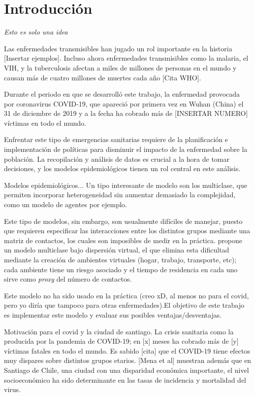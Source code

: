 \chapter{Introducción}

\textit{Esto es solo una idea}

Las enfermedades transmisibles han jugado un rol importante en la historia [Insertar ejemplos]. Incluso ahora enfermedades transmisibles como la malaria, el VIH, y la tuberculosis afectan a miles de millones de personas en el mundo y causan más de cuatro millones de muertes cada año [Cita WHO].

Durante el periodo en que se desarrolló este trabajo, la enfermedad provocada por coronavirus COVID-19, que apareció por primera vez en Wuhan (China) el 31 de diciembre de 2019 y a la fecha ha cobrado más de [INSERTAR NUMERO] víctimas en todo el mundo. 

Enfrentar este tipo de emergencias sanitarias requiere de la planificación e implementación de políticas para disminuir el impacto de la enfermedad sobre la población. La recopilación y análisis de datos es crucial a la hora de tomar decisiones, y los modelos epidemiológicos tienen un rol central en este análisis.

Modelos epidemiológicos... Un tipo interesante de modelo son los multiclase, que permiten incorporar heterogeneidad sin aumentar demasiado la complejidad, como un modelo de agentes por ejemplo. 

Este tipo de modelos, sin embargo, son usualmente difíciles de manejar, puesto que requieren especificar las interacciones entre los distintos grupos mediante una matriz de contactos, los cuales son imposibles de medir en la práctica. \cite{Bichara2015} propone un modelo multiclase bajo dispersión virtual, el que elimina esta dificultad mediante la creación de ambientes virtuales (hogar, trabajo, transporte, etc); cada ambiente tiene un riesgo asociado y el tiempo de residencia en cada uno sirve como \textit{proxy} del número de contactos. 

Este modelo no ha sido usado en la práctica (creo xD, al menos no para el covid, pero yo diría que tampoco para otras enfermedades).El objetivo de este trabajo es implementar este modelo y evaluar sus posibles ventajas/desventajas. 

Motivación para el covid y la ciudad de santiago. 
La crisis sanitaria como la producida por la pandemia de COVID-19; en [x] meses ha cobrado más de [y] víctimas fatales en todo el mundo. Es sabido [cita] que el COVID-19 tiene efectos muy dispares sobre distintos grupos etarios. [Mena et al] muestran además que en Santiago de Chile, una ciudad con una disparidad económica importante, el nivel socioeconómico ha sido determinante en las tasas de incidencia y mortalidad del virus. 

